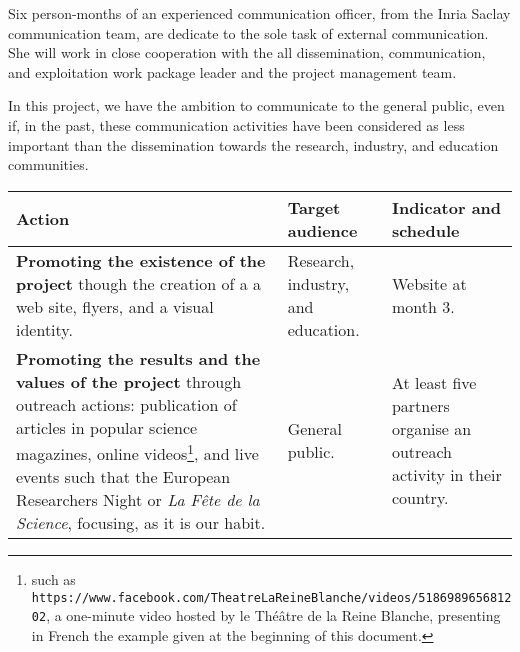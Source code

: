 Six person-months of an experienced communication officer, from the
Inria Saclay communication team, are dedicate to the sole task of
external communication.  She will work in close cooperation with the
all dissemination, communication, and exploitation work package leader
and the project management team.

In this project, we have the ambition to communicate to the general
public, even if, in the past, these communication activities have been
considered as less important than the dissemination towards the
research, industry, and education communities.

\begin{longtable}{|p{}|p{}|p{}|}
\hline {\bf Action} & {\bf Target audience} & {\bf Indicator and
  schedule} \\ \hline {\bf Promoting the existence of the project}
though the creation of a a web site, flyers, and a visual identity.  &
Research, industry, and education.  & Website at month 3.  \\ \hline
{\bf Promoting the results and the values of the project} through
outreach actions: publication of articles in popular science
magazines, online videos\footnote{such as {\tt
https://www.facebook.com/TheatreLaReineBlanche/videos/518698965681202},
a one-minute video hosted by le Th\'e\^atre de la Reine Blanche,
presenting in
French the example given at the beginning of this document.}, and live
events such that the European Researchers Night or {\em La Fête de la
  Science}, focusing, as it is our habit.  & General public.  & At
least five partners organise an outreach activity in their country.
\\ \hline
\end{longtable}

